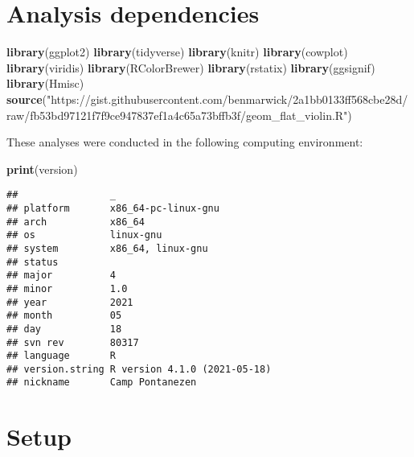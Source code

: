 \documentclass[]{book}
\newenvironment{Shaded}{\begin{snugshade}}{\end{snugshade}}
\newcommand{\KeywordTok}[1]{\textcolor[rgb]{0.13,0.29,0.53}{\textbf{#1}}}
\newcommand{\NormalTok}[1]{#1}
\newcommand{\StringTok}[1]{\textcolor[rgb]{0.31,0.60,0.02}{#1}}
\begin{document}
\hypertarget{analysis-dependencies}{%
\section{Analysis dependencies}\label{analysis-dependencies}}

\begin{Shaded}
\begin{Highlighting}[]
\KeywordTok{library}\NormalTok{(ggplot2)}
\KeywordTok{library}\NormalTok{(tidyverse)}
\KeywordTok{library}\NormalTok{(knitr)}
\KeywordTok{library}\NormalTok{(cowplot)}
\KeywordTok{library}\NormalTok{(viridis)}
\KeywordTok{library}\NormalTok{(RColorBrewer)}
\KeywordTok{library}\NormalTok{(rstatix)}
\KeywordTok{library}\NormalTok{(ggsignif)}
\KeywordTok{library}\NormalTok{(Hmisc)}
\KeywordTok{source}\NormalTok{(}\StringTok{"https://gist.githubusercontent.com/benmarwick/2a1bb0133ff568cbe28d/raw/fb53bd97121f7f9ce947837ef1a4c65a73bffb3f/geom_flat_violin.R"}\NormalTok{)}
\end{Highlighting}
\end{Shaded}

These analyses were conducted in the following computing environment:

\begin{Shaded}
\begin{Highlighting}[]
\KeywordTok{print}\NormalTok{(version)}
\end{Highlighting}
\end{Shaded}

\begin{verbatim}
##                _                           
## platform       x86_64-pc-linux-gnu         
## arch           x86_64                      
## os             linux-gnu                   
## system         x86_64, linux-gnu           
## status                                     
## major          4                           
## minor          1.0                         
## year           2021                        
## month          05                          
## day            18                          
## svn rev        80317                       
## language       R                           
## version.string R version 4.1.0 (2021-05-18)
## nickname       Camp Pontanezen
\end{verbatim}

\hypertarget{setup}{%
\section{Setup}\label{setup}}
\end{document}
